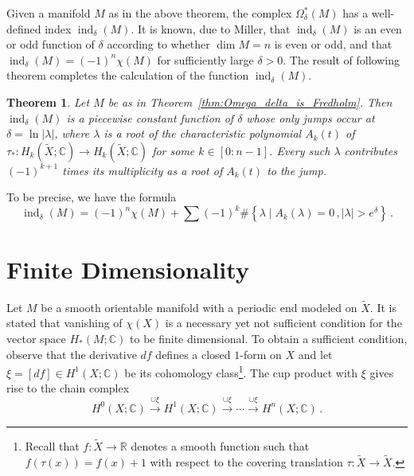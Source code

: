 \documentclass[a4paper, 12pt]{article}
\newtheorem{theorem}{Theorem}[section]
\theoremstyle{definition}
\begin{document}
Given a manifold \({ M }\) as in the above theorem, the complex \({ \Omega_{\delta}^*(M) }\) has a well-defined index \({ \operatorname{ind}_{\delta}(M) }\). It is known, due to Miller, that \({ \operatorname{ind}_{\delta}(M) }\) is an even or odd function of \({ \delta }\) according to whether \({ \dim M = n }\) is even or odd, and that \({ \operatorname{ind}_{\delta}(M) = (-1)^{n} \chi(M) }\) for sufficiently large \({ \delta > 0 }\). The result of following theorem completes the calculation of the function \({ \operatorname{ind}_{\delta}(M) }\).

\begin{theorem}
    Let \({ M }\) be as in Theorem~\ref{thm:Omega_delta_is_Fredholm}. Then \({ \operatorname{ind}_{\delta}(M) }\) is a piecewise constant function of \({ \delta }\) whose only jumps occur at \({ \delta = \ln \lvert \lambda \rvert }\), where \({ \lambda }\) is a root of the char\-ac\-ter\-is\-tic polynomial \({ A_{k}(t) }\) of \({ \tau_{*} : H_{k}(\tilde X; \mathbb C) \to H_{k}(\tilde X; \mathbb C) }\) for some \({ k \in [0 : n-1] }\). Every such \({ \lambda }\) contributes \({ (-1)^{k+1} }\) times its multiplicity as a root of \({ A_{k}(t) }\) to the jump.
\end{theorem}

To be precise, we have the formula \[
    \operatorname{ind}_{\delta}(M) = (-1)^{n} \chi(M) + \sum (-1)^{k} \#\left\{ \lambda \mid A_{k}(\lambda) = 0\,, \lvert \lambda \rvert > e^{\delta} \right\}\,.
\]

\section{Finite Dimensionality}

Let \({ M }\) be a smooth orientable manifold with a periodic end modeled on \({ \tilde X }\). It is stated that vanishing of \({ \chi(X) }\) is a necessary yet not sufficient condition for the vector space \({ H_{*}(M; \mathbb C) }\) to be finite dimensional. To obtain a sufficient condition, observe that the derivative \({ df }\) defines a closed \({ 1 }\)-form on \({ X }\) and let \({ \xi = [df] \in H^{1}(X; \mathbb C) }\) be its cohomology class\footnote{Recall that \({ f : \tilde X \to \mathbb R }\) denotes a smooth function such that \({ f(\tau(x)) = f(x) + 1 }\) with respect to the covering translation \({ \tau : \tilde X \to \tilde X }\).}. The cup product with \({ \xi }\) gives rise to the chain complex
\begin{equation}
    \label{eq:the_cup_product_chain_complex}
    H^{0}(X; \mathbb C) \overset{\cup \xi}{\longrightarrow} H^{1}(X; \mathbb C) \overset{\cup \xi}{\longrightarrow} \cdots \overset{\cup \xi}{\longrightarrow} H^{n}(X; \mathbb C)\,.
\end{equation}
\end{document}
